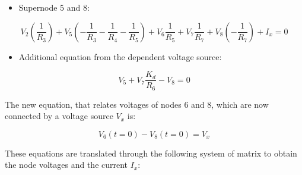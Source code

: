 \begin{itemize}
    \item Supernode 5 and 8:
\end{itemize}
\begin{equation}
    V_{2}(\frac{1}{R_{3}})+V_{5}(-\frac{1}{R_{3}}-\frac{1}{R_{4}}-\frac{1}{R_{5}})+ V_{6}\frac{1}{R_{5}}+V_{7}\frac{1}{R_{7}}+V_{8}(-\frac{1}{R_{7}}) + I_x= 0
\end{equation}

\begin{itemize}
    \item Additional equation from the dependent voltage source:
\end{itemize}
\begin{equation}
    V_{5}+V_{7}\frac{K_{d}}{R_{6}}-V_{8}=0
\end{equation}

The new equation, that relates voltages of nodes 6 and 8, which are now connected by a voltage source $V_x$ is:

\begin{equation}
V_6(t=0) - V_8(t=0) = V_x
  \label{eq:V68}
\end{equation}

These equations are translated through the following system of matrix to obtain the node voltages and the current $I_x$:

